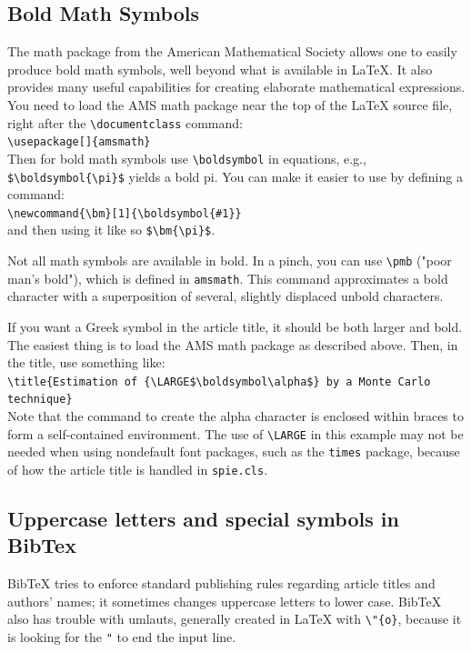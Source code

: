\documentclass[]{spie}  %
\begin{document}
\subsection{Bold Math Symbols} 

The math package from the American Mathematical Society allows one to easily produce bold math symbols, well beyond what is available in LaTeX. It also provides many useful capabilities for creating elaborate mathematical expressions. You need to load the AMS math package near the top of the LaTeX source file, right after the \verb+\documentclass+ command:\\[1ex]
\verb+\usepackage[]{amsmath}+ \\[1ex]
Then for bold math symbols use \verb+\boldsymbol+ in equations, e.g., 
\verb+$\boldsymbol{\pi}$+ 
yields a bold pi.  You can make it easier to use by defining a command:\\[1ex]
\verb+\newcommand{\bm}[1]{\boldsymbol{#1}}+ \\[1ex]
and then using it like so \verb+$\bm{\pi}$+.

Not all math symbols are available in bold.  In a pinch, you can use \verb+\pmb+ ("poor man's bold"), which is defined in \verb+amsmath+. This command approximates a bold character with a superposition of several, slightly displaced unbold characters.

If you want a Greek symbol in the article title, it should be both larger and bold. The easiest thing is to load the AMS math package as described above. 
Then, in the title, use something like:\\[1ex]
\verb+\title{Estimation of {\LARGE$\boldsymbol\alpha$} by a Monte Carlo technique}+ \\[1ex]
Note that the command to create the alpha character is enclosed within braces to form a self-contained environment. The use of \verb+\LARGE+ in this example may not be needed when using nondefault font packages, such as the {\tt times} package, because of how the article title is handled in {\tt spie.cls}.

\subsection{Uppercase letters and special symbols in BibTex} 

BibTeX tries to enforce standard publishing rules regarding article titles and authors' names; it sometimes changes uppercase letters to lower case. BibTeX also has trouble with umlauts, generally created in LaTeX with \verb+\"{o}+, because it is looking for the \verb+"+ to end the input line. 
\end{document}
